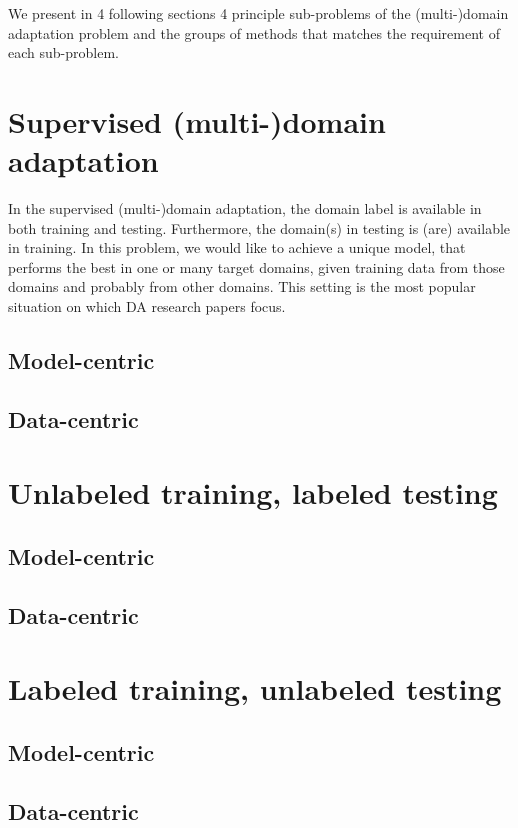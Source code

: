 We present in 4 following sections 4 principle sub-problems of the (multi-)domain adaptation problem and the groups of methods that matches the requirement of each sub-problem.

\section{Supervised (multi-)domain adaptation}
In the supervised (multi-)domain adaptation, the domain label is available in both training and testing. Furthermore, the domain(s) in testing is (are) available in training. In this problem, we would like to achieve a unique model, that performs the best in one or many target domains, given training data from those domains and probably from other domains. This setting is the most popular situation on which DA research papers focus. 

\subsection{Model-centric}

\subsection{Data-centric}

\section{Unlabeled training, labeled testing}

\subsection{Model-centric}

\subsection{Data-centric}

\section{Labeled training, unlabeled testing}

\subsection{Model-centric}

\subsection{Data-centric}

